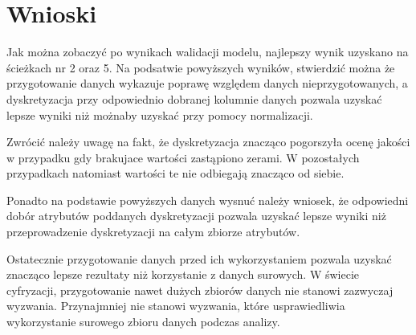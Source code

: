 \documentclass[12pt,oneside,a4paper]{book} %
\theoremstyle{break}
\begin{document}
\chapter*{Wnioski}

Jak można zobaczyć po wynikach walidacji modelu, najlepszy wynik uzyskano na ścieżkach nr 2 oraz 5. Na podsatwie powyższych wyników, stwierdzić można że przygotowanie danych wykazuje poprawę względem danych nieprzygotowanych, a dyskretyzacja przy odpowiednio dobranej kolumnie danych pozwala uzyskać lepsze wyniki niż możnaby uzyskać przy pomocy normalizacji.

Zwrócić należy uwagę na fakt, że dyskretyzacja znacząco pogorszyła ocenę jakości w przypadku gdy brakujace wartości zastąpiono zerami. W pozostałych przypadkach natomiast wartości te nie odbiegają znacząco od siebie.

Ponadto na podstawie powyższych danych wysnuć należy wniosek, że odpowiedni dobór atrybutów poddanych dyskretyzacji pozwala uzyskać lepsze wyniki niż przeprowadzenie dyskretyzacji na całym zbiorze atrybutów.

Ostatecznie przygotowanie danych przed ich wykorzystaniem pozwala uzyskać znacząco lepsze rezultaty niż korzystanie z danych surowych. W świecie cyfryzacji, przygotowanie nawet dużych zbiorów danych nie stanowi zazwyczaj wyzwania. Przynajmniej nie stanowi wyzwania, które usprawiedliwia wykorzystanie surowego zbioru danych podczas analizy.
\end{document}
